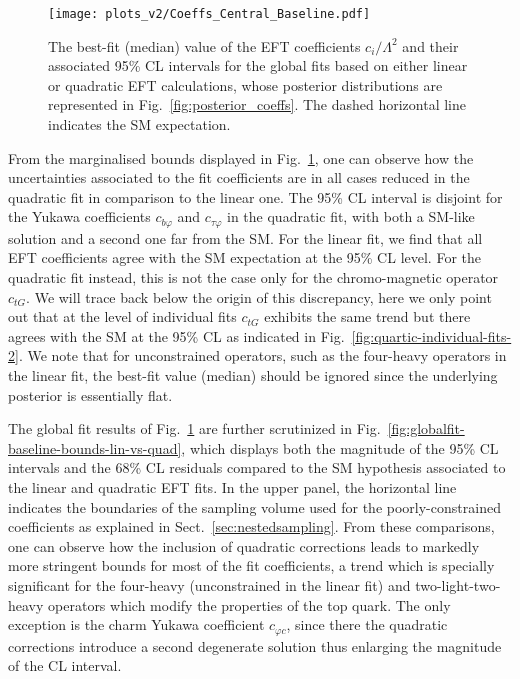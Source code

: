 

\begin{figure}[t]
  \begin{center}
    \texttt{[image: plots\_v2/Coeffs\_Central\_Baseline.pdf]}
    \vspace{-0.1cm}
    \caption{\small The best-fit (median) value of the EFT coefficients $c_i/\Lambda^2$
      and their associated 95\% CL intervals for the  global fits
      based on either linear or quadratic EFT calculations,
      whose posterior distributions are represented in
      Fig.~\ref{fig:posterior_coeffs}.
      The dashed horizontal line indicates the SM expectation.
     \label{fig:globalfit-baseline-coeffsabs-lin-vs-quad} }
  \end{center}
\end{figure}

From the marginalised bounds displayed in Fig.~\ref{fig:globalfit-baseline-coeffsabs-lin-vs-quad},
one can observe how the uncertainties associated to the fit coefficients are in all cases
reduced in the quadratic fit in comparison to the linear one.
%
The 95\% CL interval is disjoint for the Yukawa coefficients $c_{b\varphi}$
and $c_{\tau\varphi}$ in the quadratic fit,
with both a SM-like solution and a second one far from the SM.
%
For the linear fit, we find that all EFT coefficients agree with the SM expectation
at the 95\% CL level.
%
For the quadratic fit instead, this is not the case only for
the chromo-magnetic operator $c_{tG}$.
%
We will trace back below the origin of this discrepancy,
here we only point out that at the level of individual fits
$c_{tG}$ exhibits the same trend but there
agrees with the SM at the  95\% CL
as indicated in Fig.~\ref{fig:quartic-individual-fits-2}.
%
{  We note that for unconstrained operators, such as the four-heavy operators
  in the linear fit, the best-fit value (median) should be ignored since
the underlying posterior is essentially flat.}

The global fit results of Fig.~\ref{fig:globalfit-baseline-coeffsabs-lin-vs-quad}
are further scrutinized in Fig.~\ref{fig:globalfit-baseline-bounds-lin-vs-quad},
which displays both the magnitude of the 95\% CL intervals 
   and the 68\% CL residuals compared to the SM hypothesis
   associated to the linear and quadratic EFT fits.
   In the upper panel,
      the horizontal line indicates the boundaries of the sampling volume
      used for the poorly-constrained coefficients
as explained in Sect.~\ref{sec:nestedsampling}.
%
From these comparisons, one can observe how the inclusion of quadratic corrections
leads to markedly more stringent bounds for most of the fit coefficients,
a trend which is specially significant for the four-heavy (unconstrained
in the linear fit) and two-light-two-heavy operators which modify the properties
of the top quark.
%
The only exception is the charm Yukawa coefficient $c_{\varphi c}$, since there the quadratic
corrections introduce a second degenerate solution thus enlarging the magnitude
of the CL interval.

